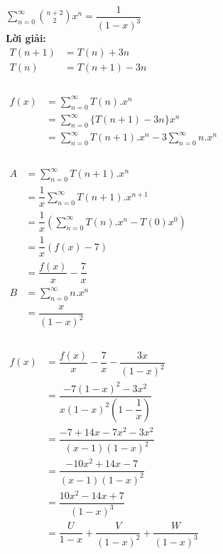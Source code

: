 \documentclass[12pt, letterpaper]{article}
\begin{document}
\begin{enumerate}
	       \\
	      $\sum_{n=0}^{\infty}\binom{n+2}{2} x^n = \dfrac{1}{(1-x)^3}$\\

	      \textbf{Lời giải:} \\
	      $\begin{aligned}
			      T(n+1) & = T(n) + 3n   \\
			      T(n)   & = T(n+1) - 3n \\
		      \end{aligned}$\\
	       \\
	      $\begin{aligned}
			      f(x) & = \sum_{n = 0}^{\infty}T(n).x^n                                 \\
			           & = \sum_{n = 0}^{\infty} \{ T(n+1)-3n \}x^n                      \\
			           & = \sum_{n = 0}^{\infty}T(n+1).x^n - 3\sum_{n = 0}^{\infty}n.x^n \\
		      \end{aligned} $ \\

	      \\
	      $\begin{aligned}
			      A & =\sum_{n = 0}^{\infty}T(n+1).x^n                       \\
			        & =\dfrac{1}{x}\sum_{n = 0}^{\infty}T(n+1).x^{n+1}       \\
			        & =\dfrac{1}{x}(\sum_{n=0}^{\infty}T(n).x^{n} - T(0)x^0) \\
			        & =\dfrac{1}{x}(f(x)-7)                                  \\
			        & =\dfrac{f(x)}{x} - \dfrac{7}{x}                        \\
			      B & =\sum_{n = 0}^{\infty}n.x^n                            \\
			        & =\dfrac{x}{(1-x)^2}                                    \\
		      \end{aligned}$\\

	      \\
	      $\begin{aligned}
			      f(x) & =\dfrac{f(x)}{x} - \dfrac{7}{x}- \dfrac{3x}{(1-x)^2}   \\
			           & = \dfrac{-7(1-x)^2-3x^2}{x(1-x)^2(1-\dfrac{1}{x})}     \\
			           & = \dfrac{-7 + 14x - 7x^2 - 3x^2}{(x-1)(1-x)^2}         \\
			           & = \dfrac{-10x^2+14x-7}{(x-1)(1-x)^2}                   \\
			           & = \dfrac{10x^2-14x+7}{(1-x)^3}                         \\
			           & = \dfrac{U}{1-x}+\dfrac{V}{(1-x)^2}+\dfrac{W}{(1-x)^3} \\
		      \end{aligned}$\\


\end{enumerate}
\end{document}
